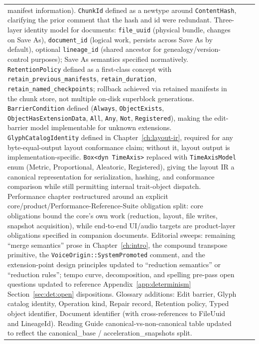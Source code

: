 \documentclass[11pt,letterpaper]{report}
\begin{document}
\begin{longtable}{p{2cm} p{2.5cm} p{9cm}}
  manifest information). \texttt{ChunkId} defined as a newtype
  around \texttt{ContentHash}, clarifying the prior comment that
  the hash and id were redundant. Three-layer identity model for
  documents: \texttt{file\_uuid} (physical bundle, changes on
  Save As), \texttt{document\_id} (logical work, persists across
  Save As by default), optional \texttt{lineage\_id} (shared
  ancestor for genealogy/version-control purposes); Save As
  semantics specified normatively. \texttt{RetentionPolicy}
  defined as a first-class concept with
  \texttt{retain\_previous\_manifests},
  \texttt{retain\_duration}, \texttt{retain\_named\_checkpoints};
  rollback achieved via retained manifests in the chunk store,
  not multiple on-disk superblock generations.
  \texttt{BarrierCondition} defined (\texttt{Always},
  \texttt{ObjectExists}, \texttt{ObjectHasExtensionData},
  \texttt{All}, \texttt{Any}, \texttt{Not}, \texttt{Registered}),
  making the edit-barrier model implementable for unknown
  extensions. \texttt{GlyphCatalogIdentity} defined in
  Chapter~\ref{ch:layout-ir}, required for any byte-equal-output
  layout conformance claim; without it, layout output is
  implementation-specific. \texttt{Box<dyn TimeAxis>} replaced
  with \texttt{TimeAxisModel} enum (Metric, Proportional,
  Aleatoric, Registered), giving the layout IR a canonical
  representation for serialization, hashing, and conformance
  comparison while still permitting internal trait-object
  dispatch. Performance chapter restructured around an explicit
  core/product/Performance-Reference-Suite obligation split:
  core obligations bound the core's own work (reduction, layout,
  file writes, snapshot acquisition), while end-to-end UI/audio
  targets are product-layer obligations specified in companion
  documents. Editorial sweeps: remaining ``merge semantics''
  prose in Chapter~\ref{ch:intro}, the compound transpose
  primitive, the \texttt{VoiceOrigin::SystemPromoted} comment,
  and the extension-point design principles updated to
  ``reduction semantics'' or ``reduction rules''; tempo curve,
  decomposition, and spelling pre-pass open questions updated
  to reference Appendix~\ref{app:determinism}
  Section~\ref{sec:det:open} dispositions. Glossary additions:
  Edit barrier, Glyph catalog identity, Operation kind, Repair
  record, Retention policy, Typed object identifier, Document
  identifier (with cross-references to FileUuid and LineageId).
  Reading Guide canonical-vs-non-canonical table updated to
  reflect the canonical\_base / acceleration\_snapshots split. \\

\end{longtable}
\end{document}
